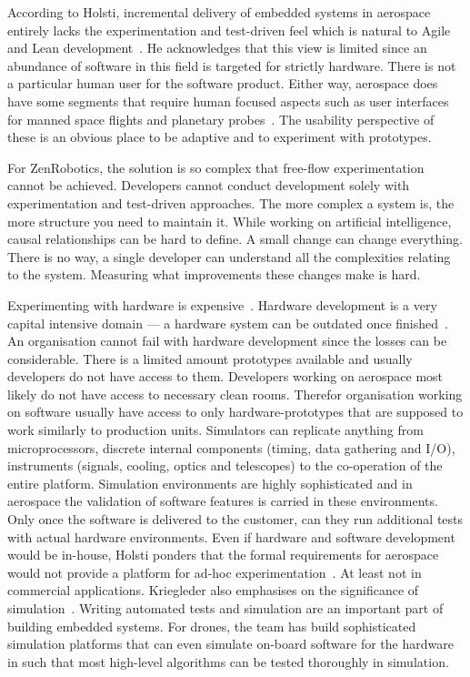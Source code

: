 \documentclass[english]{tktltiki2}
\begin{document}
According to Holsti, incremental delivery of embedded systems in aerospace entirely lacks the experimentation and test-driven feel which is natural to Agile and Lean development~\cite{Hol15b}. He acknowledges that this view is limited since an abundance of software in this field is targeted for strictly hardware. There is not a particular human user for the software product. Either way, aerospace does have some segments that require human focused aspects such as user interfaces for manned space flights and planetary probes~\cite{Hol15b}. The usability perspective of these is an obvious place to be adaptive and to experiment with prototypes.

For ZenRobotics, the solution is so complex that free-flow experimentation cannot be achieved. Developers cannot conduct development solely with experimentation and test-driven approaches. The more complex a system is, the more structure you need to maintain it. While working on artificial intelligence, causal relationships can be hard to define. A small change can change everything. There is no way, a single developer can understand all the complexities relating to the system. Measuring what improvements these changes make is hard.

Experimenting with hardware is expensive~\cite{BT15, Hol15a, Hol15b}. Hardware development is a very capital intensive domain — a hardware system can be outdated once finished~\cite{Hol15a}. An organisation cannot fail with hardware development since the losses can be considerable. There is a limited amount prototypes available and usually developers do not have access to them. Developers working on aerospace most likely do not have access to necessary clean rooms. Therefor organisation working on software usually have access to only hardware-prototypes that are supposed to work similarly to production units. Simulators can replicate anything from microprocessors, discrete internal components (timing, data gathering and I/O), instruments (signals, cooling, optics and telescopes) to the co-operation of the entire platform. Simulation environments are highly sophisticated and in aerospace the validation of software features is carried in these environments. Only once the software is delivered to the customer, can they run additional tests with actual hardware environments. Even if hardware and software development would be in-house, Holsti ponders that the formal requirements for aerospace would not provide a platform for ad-hoc experimentation~\cite{Hol15b}. At least not in commercial applications. Kriegleder also emphasises on the significance of simulation~\cite{Kri15}. Writing automated tests and simulation are an important part of building embedded systems. For drones, the team has build sophisticated simulation platforms that can even simulate on-board software for the hardware in such that most high-level algorithms can be tested thoroughly in simulation.
\end{document}
